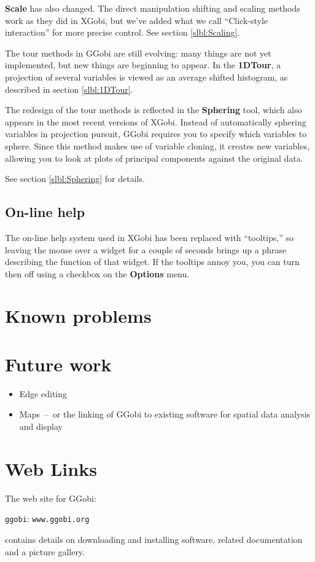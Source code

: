 \documentclass[11pt]{article}
\begin{document}
{\bf Scale} has also changed.  The direct manipulation shifting and
scaling methods work as they did in XGobi, but we've added what we
call ``Click-style interaction'' for more precise control.  See section
\ref{slbl:Scaling}.

The tour methods in GGobi are still evolving: many things are not yet
implemented, but new things are beginning to appear.  In the {\bf
1DTour}, a projection of several variables is viewed as an average
shifted histogram, as described in section \ref{slbl:1DTour}.

The redesign of the tour methods is reflected in the {\bf Sphering}
tool, which also appears in the most recent versions of XGobi.
Instead of automatically sphering variables in projection pursuit,
GGobi requires you to specify which variables to sphere.  Since this
method makes use of variable cloning, it creates new variables,
allowing you to look at plots of principal components against the
original data.

See section \ref{slbl:Sphering} for details.

\subsection{On-line help}

The on-line help system used in XGobi has been replaced with
``tooltips,'' so leaving the mouse over a widget for a couple of
seconds brings up a phrase describing the function of that widget.
If the tooltips annoy you, you can turn then off using a checkbox on
the {\bf Options} menu.

\section{Known problems}


\section{Future work}

\begin{itemize}
\item Edge editing
\item Maps~--~or the linking of GGobi to existing software for
  spatial data analysis and display
\end{itemize}

\section*{Web Links}

The web site for GGobi:

\centerline{{\tt ggobi}: {\tt www.ggobi.org}}

contains details on downloading and installing software, related
documentation and a picture gallery.

\newpage

\end{document}
